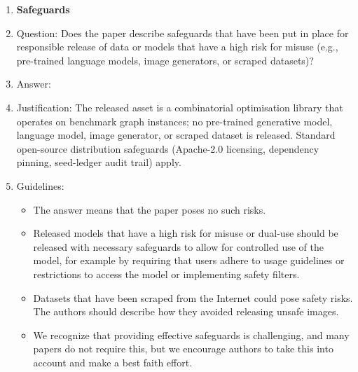 \begin{enumerate}
\begin{itemize}
        \item The authors should consider possible harms that could arise when the technology is being used as intended and functioning correctly, harms that could arise when the technology is being used as intended but gives incorrect results, and harms following from (intentional or unintentional) misuse of the technology.
        \item If there are negative societal impacts, the authors could also discuss possible mitigation strategies (e.g., gated release of models, providing defenses in addition to attacks, mechanisms for monitoring misuse, mechanisms to monitor how a system learns from feedback over time, improving the efficiency and accessibility of ML).
    \end{itemize}

\item {\bf Safeguards}
    \item[] Question: Does the paper describe safeguards that have been put in place for responsible release of data or models that have a high risk for misuse (e.g., pre-trained language models, image generators, or scraped datasets)?
    \item[] Answer: \answerNA{} %
    \item[] Justification: The released asset is a combinatorial
        optimisation library that operates on benchmark graph instances;
        no pre-trained generative model, language model, image
        generator, or scraped dataset is released. Standard
        open-source distribution safeguards (Apache-2.0 licensing,
        dependency pinning, seed-ledger audit trail) apply.
    \item[] Guidelines:
    \begin{itemize}
        \item The answer \answerNA{} means that the paper poses no such risks.
        \item Released models that have a high risk for misuse or dual-use should be released with necessary safeguards to allow for controlled use of the model, for example by requiring that users adhere to usage guidelines or restrictions to access the model or implementing safety filters.
        \item Datasets that have been scraped from the Internet could pose safety risks. The authors should describe how they avoided releasing unsafe images.
        \item We recognize that providing effective safeguards is challenging, and many papers do not require this, but we encourage authors to take this into account and make a best faith effort.
    \end{itemize}


\end{enumerate}

